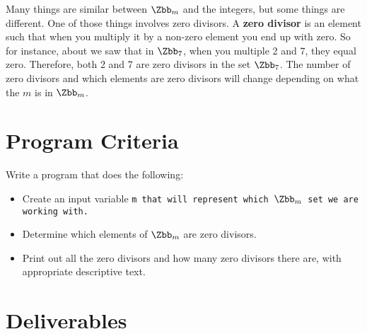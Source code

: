 \documentclass{article}
\def\prog#1{
\vspace{.1in}\begin{mdframed} \begin{center} \textbf{Programming Reminders} \end{center}#1 \end{mdframed} }
\begin{document}
	Many things are similar between $\Zbb_m$ and the integers, but some things are different.  One of those things involves zero divisors.  A \textbf{zero divisor} is an element such that when you multiply it by a non-zero element you end up with zero.  So for instance, about we saw that in $\Zbb_7$, when you multiple 2 and 7, they equal zero.  Therefore, both 2 and 7 are zero divisors in the set $\Zbb_7$.  The number of zero divisors and which elements are zero divisors will change depending on what the $m$ is in $\Zbb_m$.    

 
 	
 	
 	
 	
 	
 	
 	

	
	
	
	
	
	
	
	




\section*{Program Criteria}
	Write a program that does the following:
	\begin{itemize}
		\item Create an input variable \tt{m} that will represent which $\Zbb_m$ set we are working with.
		\item Determine which elements of $\Zbb_m$ are  zero divisors.
		\item Print out all the zero divisors and how many zero divisors there are, with appropriate descriptive text.	
	\end{itemize}







\section*{Deliverables}
	
\end{document}
